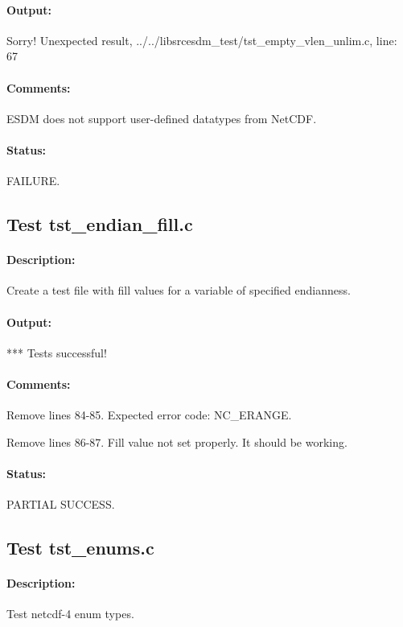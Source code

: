 \paragraph{Output:} Sorry! Unexpected result, ../../libsrcesdm\_test/tst\_empty\_vlen\_unlim.c, line: 67

\paragraph{Comments:} ESDM does not support user-defined datatypes from NetCDF.

\paragraph{Status:} FAILURE.

\subsection{Test tst\_endian\_fill.c}

\paragraph{Description:} Create a test file with fill values for a variable of specified endianness.

\paragraph{Output:} *** Tests successful!

\paragraph{Comments:} Remove lines 84-85. Expected error code: NC\_ERANGE.

Remove lines 86-87. Fill value not set properly. It should be working.

\paragraph{Status:} PARTIAL SUCCESS.

\subsection{Test tst\_enums.c}

\paragraph{Description:} Test netcdf-4 enum types.

